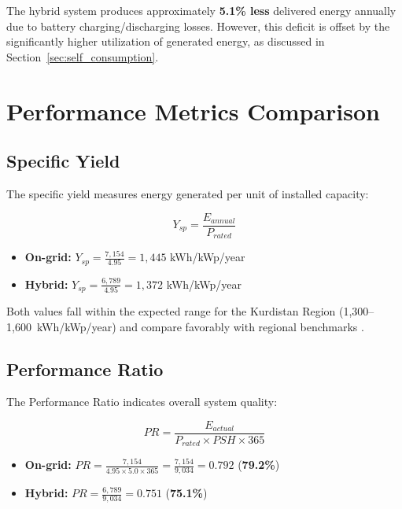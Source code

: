 The hybrid system produces approximately \textbf{5.1\% less} delivered energy annually due to battery charging/discharging losses. However, this deficit is offset by the significantly higher utilization of generated energy, as discussed in Section~\ref{sec:self_consumption}.


\section{Performance Metrics Comparison}

\subsection{Specific Yield}

The specific yield measures energy generated per unit of installed capacity:

\begin{equation}
    Y_{sp} = \frac{E_{annual}}{P_{rated}} 
\end{equation}

\begin{itemize}
    \item \textbf{On-grid:} $Y_{sp} = \frac{7{,}154}{4.95} = 1{,}445$ kWh/kWp/year
    \item \textbf{Hybrid:} $Y_{sp} = \frac{6{,}789}{4.95} = 1{,}372$ kWh/kWp/year
\end{itemize}

Both values fall within the expected range for the Kurdistan Region (1,300--1,600~kWh/kWp/year) and compare favorably with regional benchmarks \cite{globalsolaratlas2024}.


\subsection{Performance Ratio}

The Performance Ratio indicates overall system quality:

\begin{equation}
    PR = \frac{E_{actual}}{P_{rated} \times PSH \times 365}
\end{equation}

\begin{itemize}
    \item \textbf{On-grid:} $PR = \frac{7{,}154}{4.95 \times 5.0 \times 365} = \frac{7{,}154}{9{,}034} = 0.792$ (\textbf{79.2\%})
    \item \textbf{Hybrid:} $PR = \frac{6{,}789}{9{,}034} = 0.751$ (\textbf{75.1\%})
\end{itemize}

